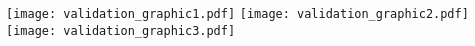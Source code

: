 \documentclass[varwidth=7in]{standalone}
\begin{document}
\texttt{[image: validation\_graphic1.pdf]}%
\texttt{[image: validation\_graphic2.pdf]}%
\texttt{[image: validation\_graphic3.pdf]}%
\end{document}
